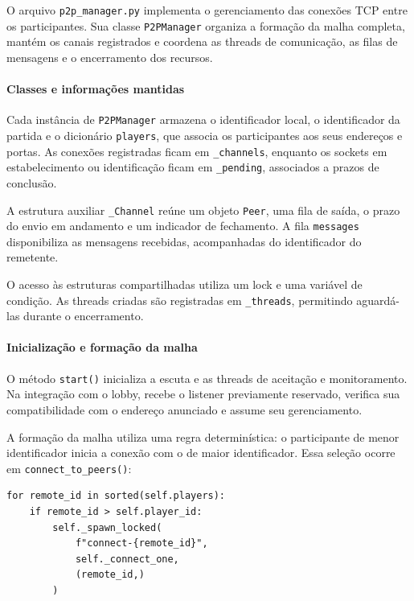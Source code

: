 \documentclass[11pt,a4paper]{article}
\begin{document}
O arquivo \texttt{p2p\_manager.py} implementa o gerenciamento das conexões TCP entre os participantes. Sua classe \texttt{P2PManager} organiza a formação da malha completa, mantém os canais registrados e coordena as threads de comunicação, as filas de mensagens e o encerramento dos recursos.

\paragraph{Classes e informações mantidas}

Cada instância de \texttt{P2PManager} armazena o identificador local, o identificador da partida e o dicionário \texttt{players}, que associa os participantes aos seus endereços e portas. As conexões registradas ficam em \texttt{\_channels}, enquanto os sockets em estabelecimento ou identificação ficam em \texttt{\_pending}, associados a prazos de conclusão.

A estrutura auxiliar \texttt{\_Channel} reúne um objeto \texttt{Peer}, uma fila de saída, o prazo do envio em andamento e um indicador de fechamento. A fila \texttt{messages} disponibiliza as mensagens recebidas, acompanhadas do identificador do remetente.

O acesso às estruturas compartilhadas utiliza um lock e uma variável de condição. As threads criadas são registradas em \texttt{\_threads}, permitindo aguardá-las durante o encerramento.

\paragraph{Inicialização e formação da malha}

O método \texttt{start()} inicializa a escuta e as threads de aceitação e monitoramento. Na integração com o lobby, recebe o listener previamente reservado, verifica sua compatibilidade com o endereço anunciado e assume seu gerenciamento.

A formação da malha utiliza uma regra determinística: o participante de menor identificador inicia a conexão com o de maior identificador. Essa seleção ocorre em \texttt{connect\_to\_peers()}:

\par\smallskip
\noindent
\begin{minipage}{\linewidth}
\begin{verbatim}
for remote_id in sorted(self.players):
    if remote_id > self.player_id:
        self._spawn_locked(
            f"connect-{remote_id}",
            self._connect_one,
            (remote_id,)
        )
\end{verbatim}
\end{minipage}
\par\smallskip
\end{document}
